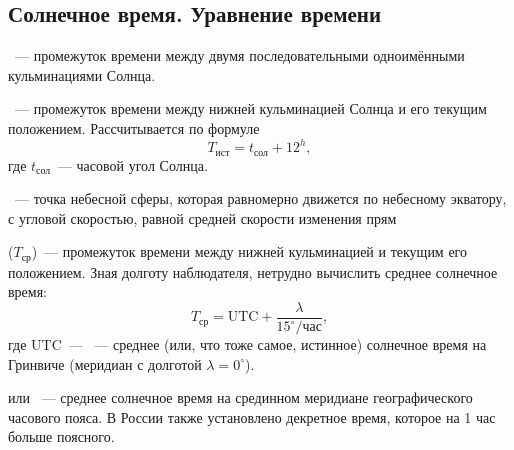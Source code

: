 \subsection{Солнечное время. Уравнение времени}



~--- промежуток времени между двумя последовательными одноимёнными кульминациями Солнца.

~--- промежуток времени между нижней кульминацией Солнца и его текущим положением. Рассчитывается по формуле
\begin{equation}
    T_{\text{ист}} = t_{\text{сол}}+12^h,
\end{equation}
где $t_{\text{сол}}$~--- часовой угол Солнца.

~--- точка небесной сферы, которая равномерно движется по небесному экватору, с угловой скоростью, равной средней скорости изменения прям

 ($T_\text{ср}$)~--- промежуток времени между нижней кульминацией  и текущим его положением.  Зная долготу наблюдателя, нетрудно вычислить среднее солнечное время:
\begin{equation*}
    T_\text{ср} = \text{UTC} + \frac{\lambda}{15^\circ/\text{час}},
\end{equation*}
где UTC~--- ~--- среднее (или, что тоже самое, истинное) солнечное время на Гринвиче (меридиан с долготой $\lambda = 0^\circ$).

 или ~--- среднее солнечное время на срединном меридиане географического часового пояса. В России также установлено декретное время, которое на 1 час больше поясного.

